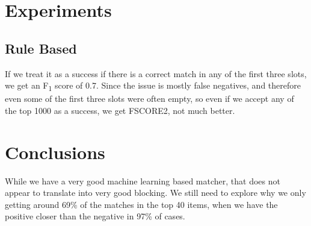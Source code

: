 \documentclass{vldb}
\begin{document}
\section{Experiments}
\subsection{Rule Based}
If we treat it as a success if there is a correct match in any of the first three slots, we get an F\textsubscript{1} score of 0.7. Since the issue is mostly false negatives, and therefore even some of the first three slots were often empty, so even if we accept any of the top 1000 as a success, we get FSCORE2, not much better.

\section{Conclusions}
While we have a very good machine learning based matcher, that does not appear to translate into very good blocking. We still need to explore why we only getting around 69\% of the matches in the top 40 items, when we have the positive closer than the negative in 97\% of cases.  

\balance





\end{document}
